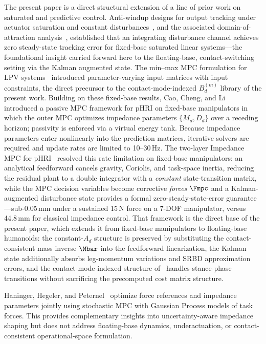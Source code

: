The present paper is a direct structural extension of a line of prior
work on saturated and predictive control.
Anti-windup designs for output tracking under actuator saturation and
constant disturbances~\cite{cao2004antiwindup}, and the associated
domain-of-attraction analysis~\cite{cao2002antiwindup}, established that an
integrating disturbance channel achieves zero steady-state tracking error
for fixed-base saturated linear systems---the foundational insight carried
forward here to the floating-base, contact-switching setting via the Kalman
augmented state.
The min--max MPC formulation for LPV systems~\cite{cao2005minmax} introduced
parameter-varying input matrices with input constraints, the direct
precursor to the contact-mode-indexed $B_d^{(m)}$ library of the present
work.
Building on these fixed-base results, Cao, Cheng, and
Li~\cite{cao2023passive} introduced a passive MPC framework for pHRI on
fixed-base manipulators in which the outer MPC optimizes impedance
parameters $\{M_d,D_d\}$ over a receding horizon; passivity is enforced via
a virtual energy tank.
Because impedance parameters enter nonlinearly into the prediction matrices,
iterative solvers are required and update rates are limited to 10--30\,Hz.
The two-layer Impedance MPC for pHRI~\cite{cao2026impedance} resolved this
rate limitation on fixed-base manipulators: an analytical feedforward
cancels gravity, Coriolis, and task-space inertia, reducing the residual
plant to a double integrator with a \emph{constant} state-transition
matrix, while the MPC decision variables become corrective \emph{forces}
$\Fmpc$ and a Kalman-augmented disturbance state provides a formal
zero-steady-state-error guarantee---sub-0.05\,mm under a sustained 15\,N
force on a 7-DOF manipulator, versus 44.8\,mm for classical impedance
control.
That framework is the direct base of the present paper, which extends it
from fixed-base manipulators to floating-base humanoids: the constant-$A_d$
structure is preserved by substituting the contact-consistent mass inverse
$\Mbar$ into the feedforward linearization, the Kalman state additionally
absorbs leg-momentum variations and SRBD approximation errors, and the
contact-mode-indexed structure of~\cite{cao2005minmax} handles stance-phase
transitions without sacrificing the precomputed cost matrix structure.

Haninger, Hegeler, and Peternel~\cite{haninger2022model} optimize force
references and impedance parameters jointly using stochastic MPC with
Gaussian Process models of task forces.
This provides complementary insights into uncertainty-aware impedance
shaping but does not address floating-base dynamics, underactuation, or
contact-consistent operational-space formulation.


